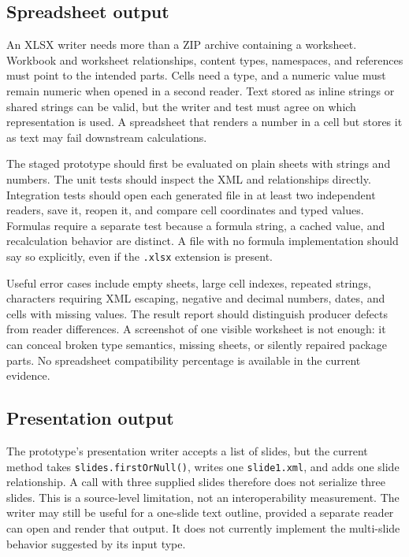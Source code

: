 \documentclass[10pt,letterpaper]{article}
\begin{document}
\subsection{Spreadsheet output}

An XLSX writer needs more than a ZIP archive containing a worksheet. Workbook and worksheet relationships, content types, namespaces, and references must point to the intended parts. Cells need a type, and a numeric value must remain numeric when opened in a second reader. Text stored as inline strings or shared strings can be valid, but the writer and test must agree on which representation is used. A spreadsheet that renders a number in a cell but stores it as text may fail downstream calculations.

The staged prototype should first be evaluated on plain sheets with strings and numbers. The unit tests should inspect the XML and relationships directly. Integration tests should open each generated file in at least two independent readers, save it, reopen it, and compare cell coordinates and typed values. Formulas require a separate test because a formula string, a cached value, and recalculation behavior are distinct. A file with no formula implementation should say so explicitly, even if the \texttt{.xlsx} extension is present.

Useful error cases include empty sheets, large cell indexes, repeated strings, characters requiring XML escaping, negative and decimal numbers, dates, and cells with missing values. The result report should distinguish producer defects from reader differences. A screenshot of one visible worksheet is not enough: it can conceal broken type semantics, missing sheets, or silently repaired package parts. No spreadsheet compatibility percentage is available in the current evidence.

\subsection{Presentation output}

The prototype's presentation writer accepts a list of slides, but the current method takes \texttt{slides.firstOrNull()}, writes one \texttt{slide1.xml}, and adds one slide relationship. A call with three supplied slides therefore does not serialize three slides. This is a source-level limitation, not an interoperability measurement. The writer may still be useful for a one-slide text outline, provided a separate reader can open and render that output. It does not currently implement the multi-slide behavior suggested by its input type.
\end{document}

